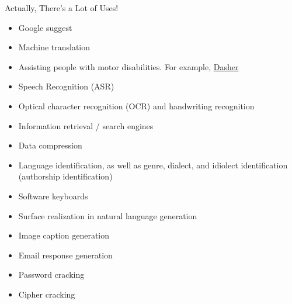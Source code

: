 \documentclass[xcolor=pdftex,x11names,table,hyperref]{beamer}
\begin{document}
\begin{frame}{Actually, There's a Lot of Uses!}
\begin{small}
\begin{spacing}{0.85}
\begin{itemize}
 \item Google suggest
 \item Machine translation
 \item Assisting people with motor disabilities.  For example, \href{https://en.wikipedia.org/wiki/Dasher_(software)}{Dasher}
 \item Speech Recognition (ASR)
 \item Optical character recognition (OCR) and handwriting recognition
 \item Information retrieval / search engines
 \item Data compression
 \item Language identification, as well as genre, dialect, and idiolect identification (authorship identification)
 \item Software keyboards
 \item Surface realization in natural language generation
 \item Image caption generation
 \item Email response generation
 \item Password cracking
 \item Cipher cracking
\end{itemize}
\end{spacing}
\end{small}
\end{frame}
\end{document}
